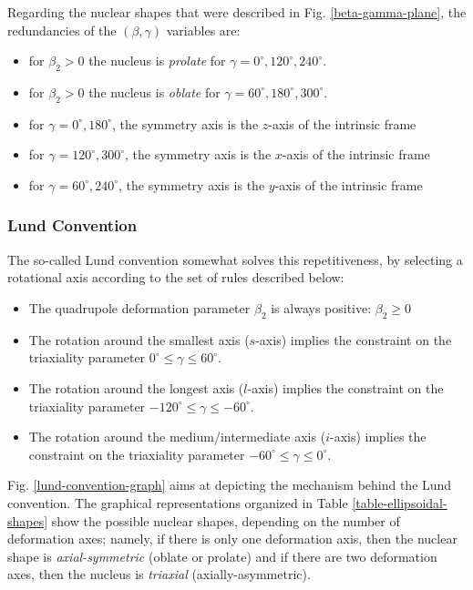 Regarding the nuclear shapes that were described in Fig. \ref{beta-gamma-plane}, the redundancies of the $(\beta,\gamma)$ variables are:
\begin{itemize}
    \item for $\beta_2>0$ the nucleus is \emph{prolate} for $\gamma=0^\circ,120^\circ,240^\circ$.
    \item for $\beta_2>0$ the nucleus is \emph{oblate} for $\gamma=60^\circ,180^\circ,300^\circ$.
    \item for $\gamma=0^\circ,180^\circ$, the symmetry axis is the $z$-axis of the intrinsic frame
    \item for $\gamma=120^\circ,300^\circ$, the symmetry axis is the $x$-axis of the intrinsic frame
    \item for $\gamma=60^\circ,240^\circ$, the symmetry axis is the $y$-axis of the intrinsic frame
\end{itemize}

\subsubsection{Lund Convention}

The so-called Lund convention \cite{andersson1976nuclear} somewhat solves this repetitiveness, by selecting a rotational axis according to the set of rules described below:
\begin{itemize}
    \item The quadrupole deformation parameter $\beta_2$ is always positive: $\beta_2\geq 0 $
    \item The rotation around the smallest axis ($s$-axis) implies the constraint on the triaxiality parameter $0^\circ\leq\gamma\leq60^\circ$.
    \item The rotation around the longest axis ($l$-axis) implies the constraint on the triaxiality parameter $-120^\circ\leq\gamma\leq-60^\circ$.
    \item The rotation around the medium/intermediate axis ($i$-axis) implies the constraint on the triaxiality parameter $-60^\circ\leq\gamma\leq 0^\circ$.
\end{itemize}

Fig. \ref{lund-convention-graph} aims at depicting the mechanism behind the Lund convention. The graphical representations organized in Table \ref{table-ellipsoidal-shapes} show the possible nuclear shapes, depending on the number of deformation axes; namely, if there is only one deformation axis, then the nuclear shape is \emph{axial-symmetric} (oblate or prolate) and if there are two deformation axes, then the nucleus is \emph{triaxial} (axially-asymmetric). 

